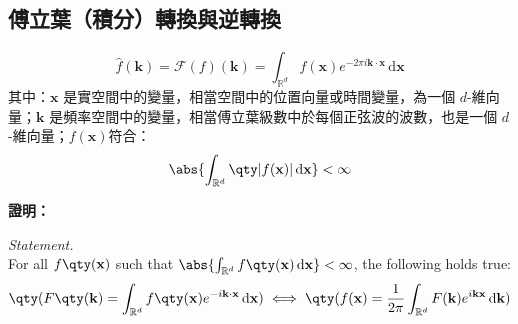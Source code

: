 \documentclass[a4paper,12pt]{article}
\begin{document}
\subsection{傅立葉（積分）轉換與逆轉換}
\[ \hat{f}(\mathbf{k}) = \mathcal{F}(f)(\mathbf{k}) = \int_{\mathbb{R}^d} f(\mathbf{x}) e^{-2\pi i \mathbf{k} \cdot \mathbf{x}} \, \mathrm{d}\mathbf{x} \]
其中：\( \mathbf{x} \) 是實空間中的變量，相當空間中的位置向量或時間變量，為一個 $d$-維向量；\( \mathbf{k} \) 是頻率空間中的變量，相當傅立葉級數中於每個正弦波的波數，也是一個 $d$-維向量；$f(\mathbf{x})$符合：
\[ \abs{\int_{\mathbb{R}^d} \qty|f(\mathbf{x})| \, \mathrm{d}\mathbf{x}} < \infty \]
\raggedright\textbf{證明：}\\
\raggedright\textit{Statement.}\\
For all \( f\qty(\mathbf{x}) \) such that \( \abs{\int_{\mathbb{R}^d} f\qty(\mathbf{x})\, \mathrm{d}\mathbf{x}}<\infty \), the following holds true:
\[\qty(F\qty(\mathbf{k}) = \int_{\mathbb{R}^d} f\qty(\mathbf{x}) e^{-i \mathbf{k}\cdot\mathbf{x}} \, \mathrm{d}\mathbf{x})\iff\qty(f(\mathbf{x}) = \frac{1}{2\pi} \int_{\mathbb{R}^d} F(\mathbf{k}) e^{i \mathbf{k} \mathbf{x}} \, \mathrm{d}\mathbf{k})\]
\end{document}
